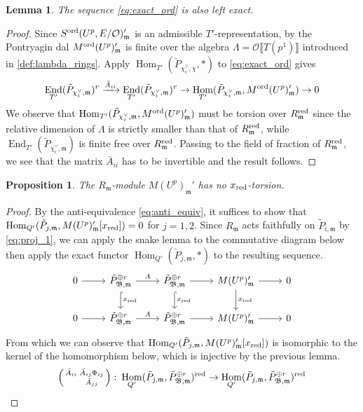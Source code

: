 \documentclass[leqno]{amsart}
\newtheorem{lem}[thm]{Lemma}
\newtheorem{prop}[thm]{Proposition}
\theoremstyle{definition}
\theoremstyle{remark}
\newcommand{\smat}[1]{\left(\begin{smallmatrix} #1 \end{smallmatrix}\right)}
\newcommand{\oo}{\mathcal{O}}
\DeclareMathOperator{\End}{End}
\DeclareMathOperator{\Hom}{Hom}
\newcommand{\fm}{\mathfrak{m}}
\newcommand{\B}{\mathfrak B} %
\newcommand{\red}{\textnormal{red}}
\newcommand{\xx}{x_\textnormal{red}}
\newcommand{\ord}{\textnormal{ord}} %
\begin{document}
\begin{lem}    
The sequence \eqref{eq:exact_ord}
is also left exact.
\end{lem}
\begin{proof}
    Since $S^{\ord}(U^p,E/\oo)_\fm'$
    is an admissible $T'$-representation,
	by \cite[Lem 2.2.11]{emeI}
    the Pontryagin dal $M^{\ord}(U^p)_\fm'$
    is finite over the algebra
    $\Lambda=\oo\llbracket T(p^1)\rrbracket$
    introduced in \eqref{def:lambda_rings}.
	Apply $\Hom_{T'}(\tilde{P}_{\chi_i^\vee,\chi},*)$
	to \eqref{eq:exact_ord} gives
\begin{equation*}
	\End_{T'}(\tilde{P}_{\chi_i^\vee,\fm})^r\xrightarrow{\bar{A}_{ii}}
	\End_{T'}(\tilde{P}_{\chi_i^\vee,\fm})^r\to 
	\Hom_{T'}(\tilde{P}_{\chi_i^\vee,\fm}, M^{\ord}(U^p)_\fm')
	\to 0
\end{equation*}
    We observe that 
    $\Hom_{T'}(\tilde{P}_{\chi_i^\vee,\fm}, M^{\ord}(U^p)_\fm')$
    must be torsion over $R_{\fm}^\red$
    since the relative dimension of $\Lambda$ is
	strictly smaller than that of $R_{\fm}^{\red}$,
    while $\End_{T'}(\tilde{P}_{\chi_i^\vee,\fm})$
	is finite free over $R_{\fm}^{\red}$.
	Passing to the field of fraction of $R_{\fm}^{\red}$,
	we see that the matrix $\bar{A}_{ii}$ has to be invertible
	and the result follows.
\end{proof}
\begin{prop}\label{prop:no_torsion}
    The $R_\fm$-module $M(U^p)_{\fm}'$
    has no $\xx$-torsion.
\end{prop}
\begin{proof}
    By the anti-equivalence \eqref{eq:anti_equiv},
	it suffices to show that
	$\Hom_{Q'}(\tilde{P}_{j,\fm}, M(U^p)_{\fm}'[\xx])=0$
	for $j=1,2$.
    Since $R_\fm$ acts faithfully on $\tilde{P}_{i,\fm}$
    by \eqref{eq:proj_1}, 
	we can apply the snake lemma to the commutative diagram
    below then apply the exact functor
    $\Hom_{Q'}(\tilde{P}_{j,\fm}, *)$
    to the resulting sequence.
    \begin{equation*}
    \begin{tikzcd}
    0 \arrow[r] & 
    \tilde{P}_{\B,\fm}^{\oplus r} 
	\arrow[d,"\xx",hookrightarrow] \arrow[r,"A"] & 
	\tilde{P}_{\B,\fm}^{\oplus r} 
	\arrow[d,"\xx",hookrightarrow] \arrow[r] & 
	M(U^p)_{\fm}'
    \arrow[d,"\xx"]  \arrow[r] & 0 \\ 
    0 \arrow[r] & 
    \tilde{P}_{\B,\fm}^{\oplus r}
	\arrow[r,"A"] & 
    \tilde{P}_{\B,\fm}^{\oplus r}
	\arrow[r] &
    M(U^p)_{\fm}'  
    \arrow[r] & 0 
    \end{tikzcd}
\end{equation*}
From which we can observe that
$\Hom_{Q'}(\tilde{P}_{j,\fm}, M(U^p)_{\fm}'[\xx])$
is isomorphic to the kernel of the homomorphism below,
which is injective by the previous lemma.
\begin{equation}\label{eq:fil_ij}
	\smat{\bar{A}_{ii}& \bar{A}_{ij}\Phi_{ij}\\& \bar{A}_{jj}}\colon 
	\Hom_{Q'}(\tilde{P}_{j,\fm},\tilde{P}_{\B,\fm}^{\oplus r})^{\red}\to
	\Hom_{Q'}(\tilde{P}_{j,\fm},\tilde{P}_{\B,\fm}^{\oplus r})^{\red}
\end{equation}
\end{proof}
\end{document}
